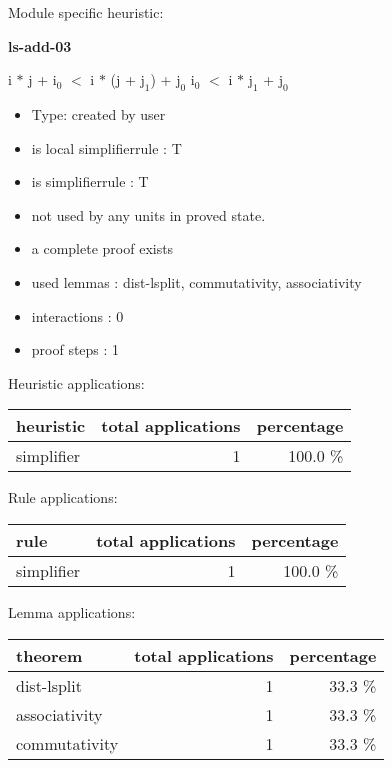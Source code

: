 \documentclass[a4paper]{article}
\begin{document}
Module specific heuristic:

\pagebreak

{\LARGE\bf ls-add-03}\label{lemma-ls-add-03}

\medskip

 \Fol i $*$ j + $\mbox{i}_{0}$ $<$ i $*$ (j + $\mbox{j}_{1}$) + $\mbox{j}_{0}$ \Equiv $\mbox{i}_{0}$ $<$ i $*$ $\mbox{j}_{1}$ + $\mbox{j}_{0}$

\begin{itemize}

\item Type: created by user

\item is local simplifierrule : T
\item is simplifierrule : T
\item not used by any units in proved state.
\item       a complete proof exists
\item       used lemmas  : dist-lsplit, commutativity, associativity
\item       interactions : 0
\item       proof steps  : 1
\end{itemize}

\medskip


Heuristic applications:

\begin{supertabular}{l|r|r}
heuristic	& total applications & percentage \\ \hline
simplifier & 1 & 100.0 \% \\

\end{supertabular}

Rule applications:

\begin{supertabular}{l|r|r}
rule	        & total applications & percentage \\ \hline
simplifier & 1 & 100.0 \% \\

\end{supertabular}

Lemma applications:

\begin{supertabular}{l|r|r}
theorem	        & total applications & percentage \\ \hline
dist-lsplit & 1 & 33.3 \% \\
associativity & 1 & 33.3 \% \\
commutativity & 1 & 33.3 \% \\

\end{supertabular}
\end{document}
